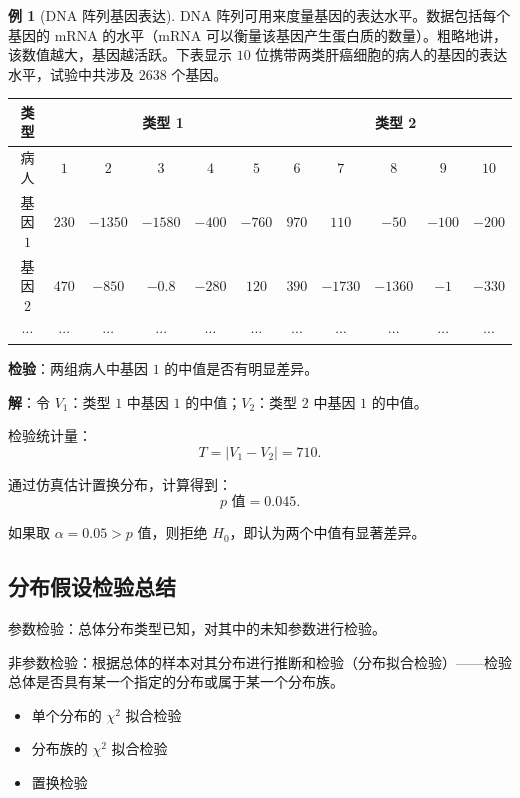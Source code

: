 \documentclass[11pt,a4paper]{report}
\theoremstyle{definition}
\newtheorem{example}{例}[chapter]
\begin{document}
\begin{example}[DNA 阵列基因表达]
DNA 阵列可用来度量基因的表达水平。数据包括每个基因的 mRNA 的水平（mRNA 可以衡量该基因产生蛋白质的数量）。粗略地讲，该数值越大，基因越活跃。下表显示 $10$ 位携带两类肝癌细胞的病人的基因的表达水平，试验中共涉及 $2638$ 个基因。

\begin{table}[htbp]
\centering
\begin{tabular}{@{}ccccccccccc@{}}
\toprule
类型 & \multicolumn{5}{c}{类型 1} & \multicolumn{5}{c}{类型 2} \\
\midrule
病人 & $1$ & $2$ & $3$ & $4$ & $5$ & $6$ & $7$ & $8$ & $9$ & $10$ \\
基因 $1$ & $230$ & $-1350$ & $-1580$ & $-400$ & $-760$ & $970$ & $110$ & $-50$ & $-100$ & $-200$ \\
基因 $2$ & $470$ & $-850$ & $-0.8$ & $-280$ & $120$ & $390$ & $-1730$ & $-1360$ & $-1$ & $-330$ \\
$\cdots$ & $\cdots$ & $\cdots$ & $\cdots$ & $\cdots$ & $\cdots$ & $\cdots$ & $\cdots$ & $\cdots$ & $\cdots$ & $\cdots$ \\
\bottomrule
\end{tabular}
\end{table}

\textbf{检验}：两组病人中基因 $1$ 的中值是否有明显差异。

\textbf{解}：令 $V_{1}$：类型 $1$ 中基因 $1$ 的中值；$V_{2}$：类型 $2$ 中基因 $1$ 的中值。

检验统计量：
\[
T=|V_{1}-V_{2}|=710.
\]

通过仿真估计置换分布，计算得到：
\[
p\text{ 值}=0.045.
\]

如果取 $\alpha=0.05>p$ 值，则拒绝 $H_{0}$，即认为两个中值有显著差异。
\end{example}

\subsection{分布假设检验总结}

参数检验：总体分布类型已知，对其中的未知参数进行检验。

非参数检验：根据总体的样本对其分布进行推断和检验（分布拟合检验）——检验总体是否具有某一个指定的分布或属于某一个分布族。
\begin{itemize}[leftmargin=2em]
    \item 单个分布的 $\chi^{2}$ 拟合检验
    \item 分布族的 $\chi^{2}$ 拟合检验
    \item 置换检验
\end{itemize}
\end{document}
